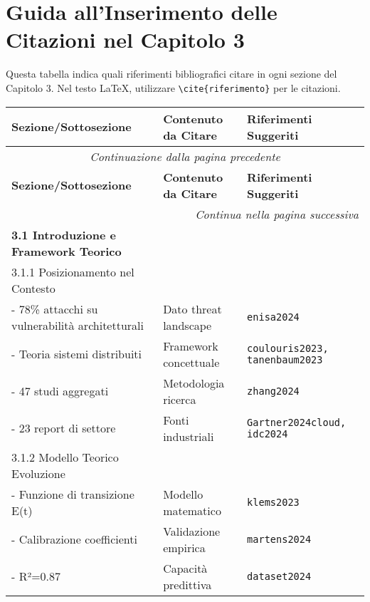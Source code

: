 \documentclass{article}
\begin{document}
\section*{Guida all'Inserimento delle Citazioni nel Capitolo 3}

\begin{tcolorbox}[colback=blue!5!white,colframe=blue!75!black,title=\textbf{Istruzioni per l'Uso}]
Questa tabella indica quali riferimenti bibliografici citare in ogni sezione del Capitolo 3. 
Nel testo LaTeX, utilizzare \texttt{\textbackslash cite\{riferimento\}} per le citazioni.
\end{tcolorbox}

\begin{longtable}{p{}|p{}|p{}}
\toprule
\textbf{Sezione/Sottosezione} & \textbf{Contenuto da Citare} & \textbf{Riferimenti Suggeriti} \\
\midrule
\endfirsthead
\multicolumn{3}{c}{\textit{Continuazione dalla pagina precedente}} \\
\toprule
\textbf{Sezione/Sottosezione} & \textbf{Contenuto da Citare} & \textbf{Riferimenti Suggeriti} \\
\midrule
\endhead
\midrule
\multicolumn{3}{r}{\textit{Continua nella pagina successiva}} \\
\endfoot
\bottomrule
\endlastfoot

\textbf{3.1 Introduzione e Framework Teorico} & & \\
\midrule
3.1.1 Posizionamento nel Contesto & & \\
- 78\% attacchi su vulnerabilità architetturali & Dato threat landscape & \texttt{enisa2024} \\
- Teoria sistemi distribuiti & Framework concettuale & \texttt{coulouris2023, tanenbaum2023} \\
- 47 studi aggregati & Metodologia ricerca & \texttt{zhang2024} \\
- 23 report di settore & Fonti industriali & \texttt{Gartner2024cloud, idc2024} \\
\midrule
3.1.2 Modello Teorico Evoluzione & & \\
- Funzione di transizione E(t) & Modello matematico & \texttt{klems2023} \\
- Calibrazione coefficienti & Validazione empirica & \texttt{martens2024} \\
- R²=0.87 & Capacità predittiva & \texttt{dataset2024} \\
\midrule


\end{longtable}
\end{document}
